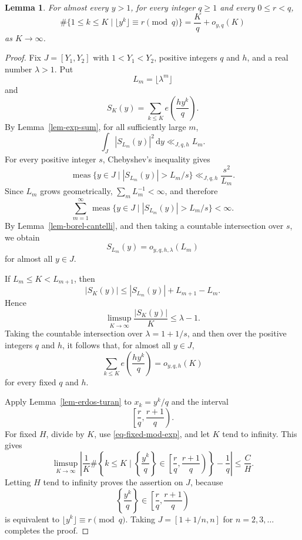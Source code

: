 \documentclass[11pt,reqno]{amsart}
\numberwithin{equation}{section}
\newtheorem{lemma}[theorem]{Lemma}
\begin{document}
    \begin{lemma}\label{lem-residue-ud}
        For almost every $y>1$, for every integer $q\ge1$ and every $0\le r<q$,
        $$
        \#\{1\le k\le K\mid \lfloor y^k\rfloor\equiv r\pmod q\}
        =\frac Kq+o_{y,q}(K)
        $$
        as $K\to\infty$.
    \end{lemma}

    \begin{proof}
        Fix $J=[Y_1,Y_2]$ with $1<Y_1<Y_2$, positive integers $q$ and $h$, and a real number $\lambda>1$. Put
        $$
        L_m=\lfloor \lambda^m\rfloor
        $$
        and
        $$
        S_K(y)=\sum_{k\le K}e\left(\frac{hy^k}{q}\right).
        $$
        By Lemma~\ref{lem-exp-sum}, for all sufficiently large $m$,
        $$
        \int_J |S_{L_m}(y)|^2\,\mathrm{d}y\ll_{J,q,h}L_m.
        $$
        For every positive integer $s$, Chebyshev's inequality gives
        $$
        \operatorname{meas}\bigl\{y\in J\mid |S_{L_m}(y)|>L_m/s\bigr\}
        \ll_{J,q,h}\frac{s^2}{L_m}.
        $$
        Since $L_m$ grows geometrically, $\sum_m L_m^{-1}<\infty$, and therefore
        $$
        \sum_{m=1}^{\infty}
        \operatorname{meas}\bigl\{y\in J\mid |S_{L_m}(y)|>L_m/s\bigr\}<\infty.
        $$
        By Lemma~\ref{lem-borel-cantelli}, and then taking a countable intersection over $s$, we obtain
        $$
        S_{L_m}(y)=o_{y,q,h,\lambda}(L_m)
        $$
        for almost all $y\in J$.

        If $L_m\le K<L_{m+1}$, then
        $$
        |S_K(y)|\le |S_{L_m}(y)|+L_{m+1}-L_m.
        $$
        Hence
        $$
        \limsup_{K\to\infty}\frac{|S_K(y)|}{K}\le \lambda-1.
        $$
        Taking the countable intersection over $\lambda=1+1/s$, and then over the positive integers $q$ and $h$, it follows that, for almost all $y\in J$,
        \begin{equation}\label{eq-fixed-mod-exp}
            \sum_{k\le K}e\left(\frac{hy^k}{q}\right)=o_{y,q,h}(K)
        \end{equation}
        for every fixed $q$ and $h$.

        Apply Lemma~\ref{lem-erdos-turan} to $x_k=y^k/q$ and the interval
        $$
        \left[\frac rq,\frac{r+1}{q}\right).
        $$
        For fixed $H$, divide by $K$, use \eqref{eq-fixed-mod-exp}, and let $K$ tend to infinity. This gives
        $$
        \limsup_{K\to\infty}
        \left|
        \frac1K\#\left\{k\le K\mid
        \left\{\frac{y^k}{q}\right\}\in
        \left[\frac rq,\frac{r+1}{q}\right)
        \right\}-\frac1q
        \right|
        \le \frac CH.
        $$
        Letting $H$ tend to infinity proves the assertion on $J$, because
        $$
        \left\{\frac{y^k}{q}\right\}\in
        \left[\frac rq,\frac{r+1}{q}\right)
        $$
        is equivalent to $\lfloor y^k\rfloor\equiv r\pmod q$. Taking $J=[1+1/n,n]$ for $n=2,3,\ldots$ completes the proof.
    \end{proof}
\end{document}
